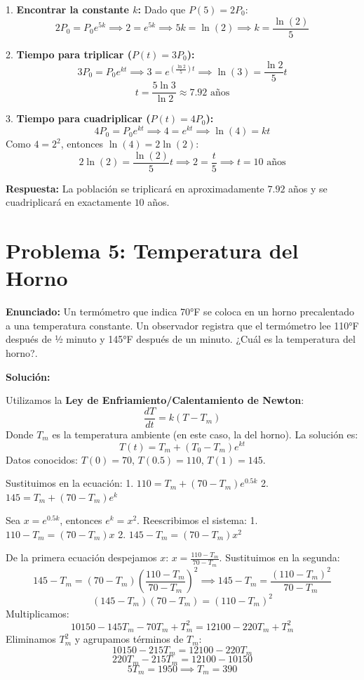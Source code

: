 \documentclass[a4paper]{article}
\begin{document}
1. \textbf{Encontrar la constante $k$:}
Dado que $P(5) = 2P_0$:
$$2P_0 = P_0 e^{5k} \implies 2 = e^{5k} \implies 5k = \ln(2) \implies k = \frac{\ln(2)}{5}$$

2. \textbf{Tiempo para triplicar ($P(t) = 3P_0$):}
$$3P_0 = P_0 e^{kt} \implies 3 = e^{(\frac{\ln 2}{5})t} \implies \ln(3) = \frac{\ln 2}{5}t$$
$$t = \frac{5 \ln 3}{\ln 2} \approx 7.92 \text{ años}$$

3. \textbf{Tiempo para cuadriplicar ($P(t) = 4P_0$):}
$$4P_0 = P_0 e^{kt} \implies 4 = e^{kt} \implies \ln(4) = kt$$
Como $4 = 2^2$, entonces $\ln(4) = 2\ln(2)$:
$$2\ln(2) = \frac{\ln(2)}{5}t \implies 2 = \frac{t}{5} \implies t = 10 \text{ años}$$

\textbf{Respuesta:} La población se triplicará en aproximadamente $7.92$ años y se cuadriplicará en exactamente $10$ años.

\section{Problema 5: Temperatura del Horno}

\textbf{Enunciado:} Un termómetro que indica 70°F se coloca en un horno precalentado a una temperatura constante. Un observador registra que el termómetro lee 110°F después de ½ minuto y 145°F después de un minuto. ¿Cuál es la temperatura del horno?.

\textbf{Solución:}

Utilizamos la \textbf{Ley de Enfriamiento/Calentamiento de Newton}:
$$\frac{dT}{dt} = k(T - T_m)$$
Donde $T_m$ es la temperatura ambiente (en este caso, la del horno). La solución es:
$$T(t) = T_m + (T_0 - T_m)e^{kt}$$
Datos conocidos: $T(0) = 70$, $T(0.5) = 110$, $T(1) = 145$.

Sustituimos en la ecuación:
1. $110 = T_m + (70 - T_m)e^{0.5k}$
2. $145 = T_m + (70 - T_m)e^{k}$

Sea $x = e^{0.5k}$, entonces $e^k = x^2$. Reescribimos el sistema:
1. $110 - T_m = (70 - T_m)x$
2. $145 - T_m = (70 - T_m)x^2$

De la primera ecuación despejamos $x$: $x = \frac{110 - T_m}{70 - T_m}$.
Sustituimos en la segunda:
$$145 - T_m = (70 - T_m) \left( \frac{110 - T_m}{70 - T_m} \right)^2 \implies 145 - T_m = \frac{(110 - T_m)^2}{70 - T_m}$$
$$(145 - T_m)(70 - T_m) = (110 - T_m)^2$$
Multiplicamos:
$$10150 - 145T_m - 70T_m + T_m^2 = 12100 - 220T_m + T_m^2$$
Eliminamos $T_m^2$ y agrupamos términos de $T_m$:
$$10150 - 215T_m = 12100 - 220T_m$$
$$220T_m - 215T_m = 12100 - 10150$$
$$5T_m = 1950 \implies T_m = 390$$
\end{document}
